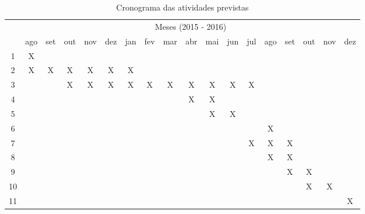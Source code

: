 \begin{table}[!htpb]
  \centering
  \begin{small}
    \setlength{\tabcolsep}{4pt}
    \begin{tabular}{|c|c|c|c|c|c|c|c|c|c|c|c|c|c|c|c|c|c|}\hline
      & \multicolumn{17}{c|}{Meses (2015 - 2016)}\\ \cline{2-18}
      \raisebox{1.5ex}{Etapa} & ago & set & out & nov & dez & jan & fev & mar & abr & mai & jun & jul & ago & set & out & nov & dez \\ \hline
      1 & X &   &   &   &   &   &   &   &   &   &   &   &   &   &   &   &   \\ \hline
      2 & X & X & X & X & X & X &   &   &   &   &   &   &   &   &   &   &   \\ \hline
      3 &   &   & X & X & X & X & X & X & X & X & X & X &   &   &   &   &   \\ \hline
      4 &   &   &   &   &   &   &   &   & X & X &   &   &   &   &   &   &   \\ \hline
      5 &   &   &   &   &   &   &   &   &   & X & X &   &   &   &   &   &   \\ \hline
      6 &   &   &   &   &   &   &   &   &   &   &   &   & X &   &   &   &   \\ \hline
      7 &   &   &   &   &   &   &   &   &   &   &   & X & X & X &   &   &   \\ \hline
      8 &   &   &   &   &   &   &   &   &   &   &   &   & X & X &   &   &   \\ \hline
      9 &   &   &   &   &   &   &   &   &   &   &   &   &   & X & X &   &   \\ \hline
      10 &  &   &   &   &   &   &   &   &   &   &   &   &   &   & X & X &   \\ \hline
      11 &  &   &   &   &   &   &   &   &   &   &   &   &   &   &   &   & X \\ \hline
    \end{tabular}
  \end{small}
  \caption{Cronograma das atividades previstas}
  \label{t_cronograma}
\end{table}

